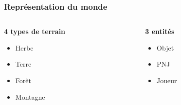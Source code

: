 \documentclass{beamer}
\begin{document}
\begin{frame}

   \frametitle{Représentation du monde}
 \begin{columns}[t]
  \begin{column}{5cm}
\textbf{4 types de terrain} \\
\vspace{5mm} 
\begin{itemize}
 \item  Herbe  ~\\
\vspace{5mm} 
 \item   Terre ~ \\
\vspace{5mm} 
 \item  Forêt ~ \\
\vspace{5mm} 
 \item  Montagne 
\end{itemize}
  \end{column}
  
  \begin{column}{5cm}
\textbf{3 entités}
\vspace{5mm} 
\begin{itemize}
 \item  Objet ~ \\
\vspace{5mm} 
 \item  PNJ ~ \\
\vspace{5mm} 
 \item Joueur 
\end{itemize}

  \end{column}
 \end{columns}



\end{frame}
\end{document}
